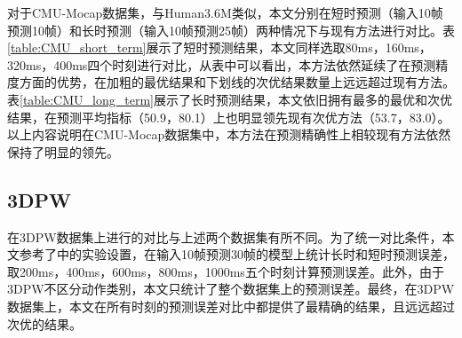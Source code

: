 对于CMU-Mocap数据集，与Human3.6M类似，本文分别在短时预测（输入10帧预测10帧）和长时预测（输入10帧预测25帧）两种情况下与现有方法进行对比。表\ref{table:CMU_short_term}展示了短时预测结果，本文同样选取80ms，160ms，320ms，400ms四个时刻进行对比，从表中可以看出，本方法依然延续了在预测精度方面的优势，在加粗的最优结果和下划线的次优结果数量上远远超过现有方法。表\ref{table:CMU_long_term}展示了长时预测结果，本文依旧拥有最多的最优和次优结果，在预测平均指标（50.9，80.1）上也明显领先现有次优方法（53.7，83.0）。以上内容说明在CMU-Mocap数据集中，本方法在预测精确性上相较现有方法依然保持了明显的领先。

\begin{table}[ht]
    \caption{3DPW上的长短时预测误差对比}
    \huge
    \centering
    \renewcommand\arraystretch{0.7}
    \label{table:3DPW_shortlong}
    \end{table}

\subsection{3DPW}
在3DPW数据集上进行的对比与上述两个数据集有所不同。为了统一对比条件，本文参考了\parencite{mao2019learning}中的实验设置，在输入10帧预测30帧的模型上统计长时和短时预测误差，取200ms，400ms，600ms，800ms，1000ms五个时刻计算预测误差。此外，由于3DPW不区分动作类别，本文只统计了整个数据集上的预测误差。最终，在3DPW数据集上，本文在所有时刻的预测误差对比中都提供了最精确的结果，且远远超过次优的结果。


